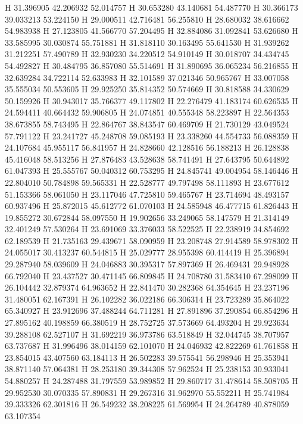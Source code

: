 \documentclass{article}
\begin{document}
H 31.396905 42.206932 52.014757
H 30.653280 43.140681 54.487770
H 30.366173 39.033213 53.224150
H 29.000511 42.716481 56.255810
H 28.680032 38.616662 54.983938
H 27.123805 41.566770 57.204495
H 32.884086 31.092841 53.626680
H 33.585995 30.030874 55.751881
H 31.818110 30.163495 55.641530
H 31.939262 31.212251 57.490789
H 32.930230 34.220512 54.910149
H 30.018707 34.434745 54.492827
H 30.484795 36.857080 55.514691
H 31.890695 36.065234 56.216855
H 32.639284 34.722114 52.633983
H 32.101589 37.021346 50.965767
H 33.007058 35.555034 50.553605
H 29.925250 35.814352 50.574669
H 30.818588 34.330629 50.159926
H 30.943017 35.766377 49.117802
H 22.276479 41.183174 60.626535
H 24.594411 40.664432 59.906805
H 24.074851 40.555348 58.223897
H 22.564353 38.673855 58.743495
H 22.864767 38.843547 60.469709
H 21.730129 43.049524 57.791122
H 23.241727 45.248708 59.085193
H 23.338260 44.554733 56.088359
H 24.107684 45.955117 56.841957
H 24.828660 42.128516 56.188213
H 26.128838 45.416048 58.513256
H 27.876483 43.528638 58.741491
H 27.643795 50.644892 61.047393
H 25.555767 50.040312 60.753295
H 24.845741 49.004954 58.146446
H 22.804010 50.784898 59.565331
H 22.528777 49.797498 58.111893
H 23.677612 51.153366 58.061050
H 23.117046 47.725810 59.465767
H 23.714694 48.493157 60.937496
H 25.872015 45.612772 61.070103
H 24.585948 46.477715 61.826443
H 19.855272 30.672844 58.097550
H 19.902656 33.249065 58.147579
H 21.314149 32.401249 57.530264
H 23.691069 33.376033 58.522525
H 22.238919 34.854692 62.189539
H 21.735163 29.439671 58.090959
H 23.208748 27.914589 58.978302
H 24.055017 30.413237 60.544815
H 25.029777 28.955398 60.414419
H 25.396894 29.287940 58.039609
H 24.046883 30.395317 57.897369
H 26.469431 29.948928 66.792040
H 23.437527 30.471145 66.809845
H 24.708780 31.583410 67.298099
H 26.104442 32.879374 64.963652
H 22.841470 30.282368 64.354645
H 23.237196 31.480051 62.167391
H 26.102282 36.022186 66.306314
H 23.723289 35.864022 65.340927
H 23.912696 37.488244 64.711281
H 27.891896 37.290854 66.854296
H 27.895162 40.198859 66.380519
H 28.752725 37.573669 64.493204
H 29.923634 39.288108 62.527107
H 31.692219 36.973786 63.518849
H 32.044745 38.707957 63.737687
H 31.996496 38.014159 62.101070
H 24.046932 42.822269 61.761858
H 23.854015 43.407560 63.184113
H 26.502283 39.575541 56.298946
H 25.353941 38.871140 57.064381
H 28.253180 39.344308 57.962524
H 25.238153 30.933041 54.880257
H 24.287488 31.797559 53.989852
H 29.860717 31.478614 58.508705
H 29.952530 30.070335 57.890831
H 29.267316 31.962970 55.552211
H 25.741984 39.333326 62.301816
H 26.549232 38.208225 61.569954
H 24.264789 40.878059 63.107354
\end{document}
